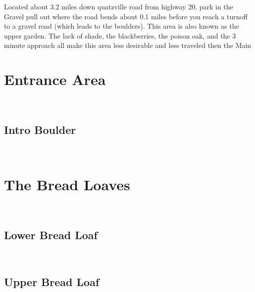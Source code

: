 \raggedcolumns
\begin{multicols}{2}
\begin{minipage}{\columnwidth}
Located about 3.2 miles down quatzville road from highway 20, park in the Gravel pull out where the road bends about 0.1 miles before you reach a turnoff to a gravel road (which leads to the boulders). This area is also known as the upper garden. The lack of shade, the blackberries, the poison oak, and the 3 minute approach all make this area less desirable and less traveled then the Main
\end{minipage}

\newpage
		\section{Entrance Area}\label{sa:Entrance Area}
	\begin{minipage}{\columnwidth}
	\
	\end{minipage}
	
			\begin{minipage}{\columnwidth}
			\subsection*{Intro Boulder}\label{bf:Intro Boulder}
			\
			
			\end{minipage}
			
\newpage
		\section{The Bread Loaves}\label{sa:The Bread Loaves}
	\begin{minipage}{\columnwidth}
	\
	\end{minipage}
	
			\begin{minipage}{\columnwidth}
			\subsection*{Lower Bread Loaf}\label{bf:Lower Bread Loaf}
			\
			
			\end{minipage}
			
			\begin{minipage}{\columnwidth}
			\subsection*{Upper Bread Loaf}\label{bf:Upper Bread Loaf}
			\
			

\end{minipage}
\end{multicols}
